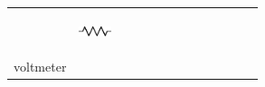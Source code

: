 \begin{center}
\begin{xtabular*}{\mytablewidth}[t]{|p{10\mystarwidth}|p{10\mystarwidth}|p{10\mystarwidth}|}
     \tabularnewline{}
    
    
         &
    
    
        
                    
    \setcounter{subfigure}{0}

\label{m38516*id63056}
    \begin{center}
    \label{m38516*id63056!!!underscore!!!media}\label{m38516*id63056!!!underscore!!!printimage}\includegraphics[width=0.2\textwidth]{col11305.imgs/m38516_PG10C9_005.png} %
        
      \vspace{2pt}
    \vspace{.1in}
    
    \end{center}



    \addtocounter{footnote}{-0}
    
                   &
    
    
     \tabularnewline{}
    
    
        voltmeter &
    

\end{xtabular*}
\end{center}
